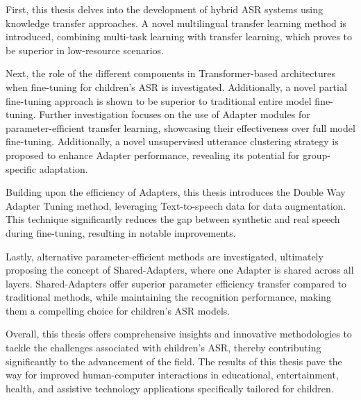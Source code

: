 First, this thesis delves into the development of hybrid ASR systems using knowledge transfer approaches. A novel multilingual transfer learning method is introduced, combining multi-task learning with transfer learning, which proves to be superior in low-resource scenarios.

Next, the role of the different components in Transformer-based architectures when fine-tuning for children's ASR is investigated. Additionally, a novel partial fine-tuning approach is shown to be superior to traditional entire model fine-tuning. Further investigation focuses on the use of Adapter modules for parameter-efficient transfer learning, showcasing their effectiveness over full model fine-tuning. Additionally, a novel unsupervised utterance clustering strategy is proposed to enhance Adapter performance, revealing its potential for group-specific adaptation. 

Building upon the efficiency of Adapters, this thesis introduces the Double Way Adapter Tuning method, leveraging Text-to-speech data for data augmentation. This technique significantly reduces the gap between synthetic and real speech during fine-tuning, resulting in notable improvements.

Lastly, alternative parameter-efficient methods are investigated, ultimately proposing the concept of Shared-Adapters, where one Adapter is shared across all layers. Shared-Adapters offer superior parameter efficiency transfer compared to traditional methods, while maintaining the recognition performance, making them a compelling choice for children's ASR models.

Overall, this thesis offers comprehensive insights and innovative methodologies to tackle the challenges associated with children's ASR, thereby contributing significantly to the advancement of the field. The results of this thesis pave the way for improved human-computer interactions in educational, entertainment, health, and assistive technology applications specifically tailored for children. 
\newpage